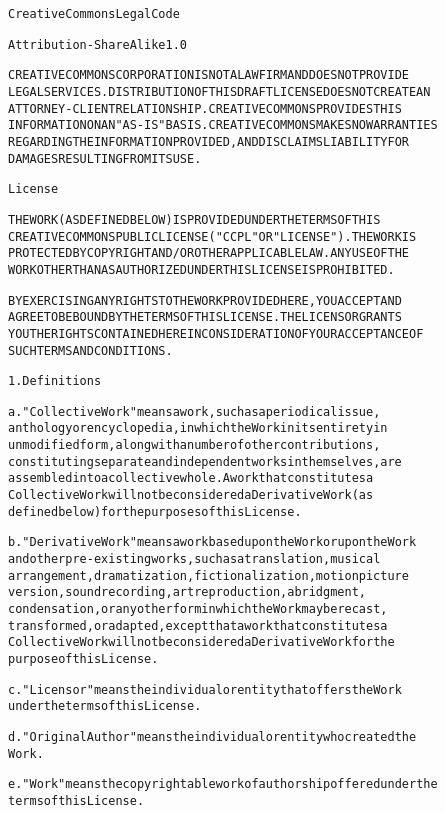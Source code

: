 \documentclass{report}
\begin{document}
\begin{alltt}
Creative Commons Legal Code

Attribution-ShareAlike 1.0

CREATIVE COMMONS CORPORATION IS NOT A LAW FIRM AND DOES NOT PROVIDE
LEGAL SERVICES. DISTRIBUTION OF THIS DRAFT LICENSE DOES NOT CREATE AN
ATTORNEY-CLIENT RELATIONSHIP. CREATIVE COMMONS PROVIDES THIS
INFORMATION ON AN "AS-IS" BASIS. CREATIVE COMMONS MAKES NO WARRANTIES
REGARDING THE INFORMATION PROVIDED, AND DISCLAIMS LIABILITY FOR
DAMAGES RESULTING FROM ITS USE.

License

THE WORK (AS DEFINED BELOW) IS PROVIDED UNDER THE TERMS OF THIS
CREATIVE COMMONS PUBLIC LICENSE ("CCPL" OR "LICENSE"). THE WORK IS
PROTECTED BY COPYRIGHT AND/OR OTHER APPLICABLE LAW. ANY USE OF THE
WORK OTHER THAN AS AUTHORIZED UNDER THIS LICENSE IS PROHIBITED.

BY EXERCISING ANY RIGHTS TO THE WORK PROVIDED HERE, YOU ACCEPT AND
AGREE TO BE BOUND BY THE TERMS OF THIS LICENSE. THE LICENSOR GRANTS
YOU THE RIGHTS CONTAINED HERE IN CONSIDERATION OF YOUR ACCEPTANCE OF
SUCH TERMS AND CONDITIONS.

1. Definitions

a. "Collective Work" means a work, such as a periodical issue,
   anthology or encyclopedia, in which the Work in its entirety in
   unmodified form, along with a number of other contributions,
   constituting separate and independent works in themselves, are
   assembled into a collective whole. A work that constitutes a
   Collective Work will not be considered a Derivative Work (as
   defined below) for the purposes of this License.

b. "Derivative Work" means a work based upon the Work or upon the Work
   and other pre-existing works, such as a translation, musical
   arrangement, dramatization, fictionalization, motion picture
   version, sound recording, art reproduction, abridgment,
   condensation, or any other form in which the Work may be recast,
   transformed, or adapted, except that a work that constitutes a
   Collective Work will not be considered a Derivative Work for the
   purpose of this License.

c. "Licensor" means the individual or entity that offers the Work
   under the terms of this License.

d. "Original Author" means the individual or entity who created the
   Work.

e. "Work" means the copyrightable work of authorship offered under the
   terms of this License.


\end{alltt}
\end{document}
